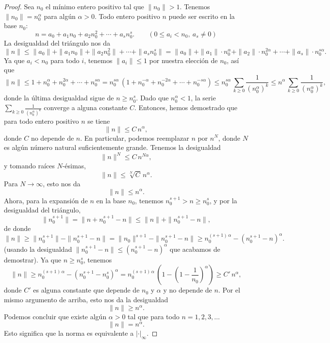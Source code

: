 \documentclass{article}
\numberwithin{equation}{section}
\theoremstyle{definition}
\begin{document}
\begin{proof}
  Sea $n_0$ el mínimo entero positivo tal que $\|n_0\| > 1$. Tenemos
  $\|n_0\| = n_0^\alpha$ para algún $\alpha > 0$. Todo entero positivo $n$ puede
  ser escrito en la base $n_0$:
  $$n = a_0 + a_1 n_0 + a_2 n_0^2 + \cdots + a_s n_0^s. \quad\quad (0 \le a_i < n_0, ~ a_s \ne 0)$$
  La desigualdad del triángulo nos da
  \[ \|n\| \le \|a_0\| + \|a_1 n_0\| + \|a_2 n_0^2\| + \cdots + \|a_s n_0^s\| =
     \|a_0\| + \|a_1\|\cdot n_0^\alpha + \|a_2\|\cdot n_0^{2\alpha} + \cdots +
     \|a_s\|\cdot n_0^{s\alpha}. \]
  Ya que $a_i < n_0$ para todo $i$, tenemos $\|a_i\| \le 1$ por nuestra elección
  de $n_0$, así que
  \[ \|n\| \le 1 + n_0^\alpha + n_0^{2\alpha} + \cdots + n_0^{s\alpha} =
     n_0^{s\alpha} \, (1 + n_0^{-\alpha} + n_0^{-2\alpha} + \cdots +
     n_0^{-s\alpha}) \le n_0^{s\alpha} \, \sum_{k\ge 0} \frac{1}{(n_0^\alpha)^k}
     \le n^\alpha \, \sum_{k\ge 0} \frac{1}{(n_0^\alpha)^k}, \]
  donde la última desigualdad sigue de $n \ge n_0^s$. Dado que $n_0^\alpha < 1$,
  la serie $\sum_{k\ge 0} \frac{1}{(n_0^\alpha)^k}$ converge a alguna constante
  $C$. Entonces, hemos demostrado que para todo entero positivo $n$ se tiene
  $$\|n\| \le C\,n^\alpha,$$
  donde $C$ no depende de $n$. En particular, podemos reemplazar $n$ por $n^N$,
  donde $N$ es algún número natural suficientemente grande. Tenemos la
  desigualdad
  $$\|n\|^N \le C\,n^{N\alpha},$$
  y tomando raíces $N$-ésimas,
  $$\|n\| \le \sqrt[N]{C}\,n^\alpha.$$
  Para $N \to \infty$, esto nos da
  $$\|n\| \le n^\alpha.$$
  Ahora, para la expansión de $n$ en la base $n_0$, tenemos
  $n_0^{s+1} > n \ge n_0^s$, y por la desigualdad del triángulo,
  $$\|n_0^{s+1}\| = \|n + n_0^{s+1} - n\| \le \|n\| + \|n_0^{s+1} - n\|,$$
  de donde
  \[ \|n\| \ge \|n_0^{s+1}\| - \|n_0^{s+1} - n\| =
     \|n_0\|^{s+1} - \|n_0^{s+1} - n\| \ge n_0^{(s+1)\,\alpha} - (n_0^{s+1} - n)^\alpha. \]
  (usando la desigualdad $\|n_0^{s+1} - n\| \le (n_0^{s+1} - n)^\alpha$
  que acabamos de demostrar). Ya que $n \ge n_0^s$, tenemos
  \[ \|n\| \ge
     n_0^{(s+1)\,\alpha} - (n_0^{s+1} - n_0^s)^\alpha =
     n_0^{(s+1)\,\alpha} \, \left(1 - \left(1 - \frac{1}{n_0}\right)^\alpha\right) \ge
     C'\,n^\alpha, \]
  donde $C'$ es alguna constante que depende de $n_0$ y $\alpha$ y no depende
  de $n$. Por el mismo argumento de arriba, esto nos da la desigualdad
  $$\|n\| \ge n^\alpha.$$
  Podemos concluir que existe algún $\alpha > 0$ tal que para todo
  $n = 1,2,3,\ldots$
  $$\|n\| = n^\alpha.$$
  Esto significa que la norma es equivalente a $|\cdot|_\infty$.

  \vspace{1em}


\end{proof}
\end{document}
